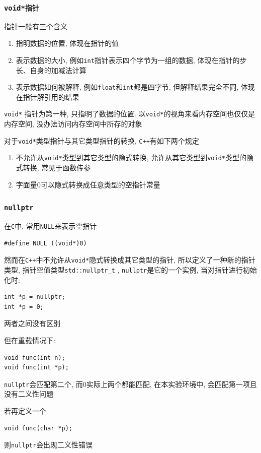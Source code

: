 \subsubsection{\tt{void*}指针}
指针一般有三个含义
\begin{enumerate}
	\item 指明数据的位置, 体现在指针的值
	\item 表示数据的大小, 例如{\tt int}指针表示四个字节为一组的数据, 体现在指针的步长、自身的加减法计算
	\item 表示数据如何被解释, 例如{\tt float}和{\tt int}都是四字节, 但解释结果完全不同, 体现在指针解引用的结果
\end{enumerate}

{\tt void*} 指针为第一种, 只指明了数据的位置. 以{\tt void*}的视角来看内存空间也仅仅是内存空间, 没办法访问内存空间中所存的对象

对于{\tt void*}类型指针与其它类型指针的转换, {\tt C++}有如下两个规定
\begin{enumerate}
	\item 不允许从{\tt void*}类型到其它类型的隐式转换, 允许从其它类型到{\tt void*}类型的隐式转换, 常见于函数传参
	\item 字面量0可以隐式转换成任意类型的空指针常量
\end{enumerate}

\subsubsection{\tt{nullptr}}

在{\tt C}中, 常用{\tt NULL}来表示空指针
\begin{lstlisting}[xleftmargin=2em]
#define NULL ((void*)0)
\end{lstlisting}
然而在{\tt C++}中不允许从{\tt void*}隐式转换成其它类型的指针, 所以定义了一种新的指针类型, 指针空值类型{\tt std::nullptr\_t}
	, {\tt nullptr}是它的一个实例, 当对指针进行初始化时:
\begin{lstlisting}[xleftmargin=2em]
int *p = nullptr;
int *p = 0;
\end{lstlisting}
两者之间没有区别

\noindent 但在重载情况下:
\begin{lstlisting}[xleftmargin=2em]
void func(int n);
void func(int *p);
\end{lstlisting}
{\tt nullptr}会匹配第二个, 而0实际上两个都能匹配, 在本实验环境中, 会匹配第一项且没有二义性问题

\noindent 若再定义一个
\begin{lstlisting}[xleftmargin=2em]
void func(char *p);
\end{lstlisting}
则{\tt nullptr}会出现二义性错误

